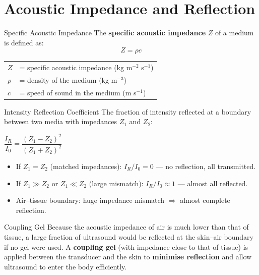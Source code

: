 \section{Acoustic Impedance and Reflection}

\begin{definitionbox}{Specific Acoustic Impedance}
The \textbf{specific acoustic impedance} $Z$ of a medium is defined as:
$$Z = \rho c$$
\begin{tabular}{@{}ll@{}}
$Z$ & = specific acoustic impedance (kg m$^{-2}$ s$^{-1}$) \\
$\rho$ & = density of the medium (kg m$^{-3}$) \\
$c$ & = speed of sound in the medium (m s$^{-1}$) \\
\end{tabular}
\end{definitionbox}

\begin{formulabox}{Intensity Reflection Coefficient}
The fraction of intensity reflected at a boundary between two media with impedances $Z_1$ and $Z_2$:
\begin{center}
\Large $\dfrac{I_R}{I_0} = \dfrac{(Z_1 - Z_2)^2}{(Z_1 + Z_2)^2}$
\end{center}
\vspace{0.3em}
\begin{itemize}[itemsep=2pt]
  \item If $Z_1 = Z_2$ (matched impedances): $I_R/I_0 = 0$ — no reflection, all transmitted.
  \item If $Z_1 \gg Z_2$ or $Z_1 \ll Z_2$ (large mismatch): $I_R/I_0 \approx 1$ — almost all reflected.
  \item Air--tissue boundary: huge impedance mismatch $\Rightarrow$ almost complete reflection.
\end{itemize}
\end{formulabox}

\begin{keybox}{Coupling Gel}
Because the acoustic impedance of air is much lower than that of tissue, a large fraction of ultrasound would be reflected at the skin--air boundary if no gel were used. A \textbf{coupling gel} (with impedance close to that of tissue) is applied between the transducer and the skin to \textbf{minimise reflection} and allow ultrasound to enter the body efficiently.
\end{keybox}

